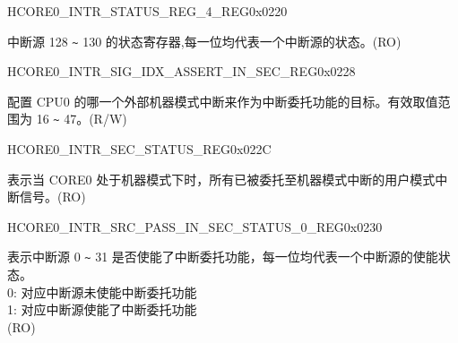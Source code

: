 \begin{register}{H}{CORE0\_INTR\_STATUS\_REG\_4\_REG}{0x0220}\label{regdesc:CORE0INTRSTATUSREG4REG}
%
\regnewline%
\begin{regdesc}\begin{reglist}
\label{fielddesc:CORE0INTRSTATUS4}\item [CORE0\_INTR\_STATUS\_4] 中断源 128 \verb+~+ 130 的状态寄存器,每一位均代表一个中断源的状态。(RO)
\end{reglist}\end{regdesc}
\end{register}

\begin{register}{H}{CORE0\_INTR\_SIG\_IDX\_ASSERT\_IN\_SEC\_REG}{0x0228}\label{regdesc:CORE0INTRSIGIDXASSERTINSECREG}
%
%
\regnewline%
\begin{regdesc}\begin{reglist}
\label{fielddesc:CORE0INTRSIGIDXASSERTINSEC}\item [CORE0\_INTR\_SIG\_IDX\_ASSERT\_IN\_SEC] 配置 CPU0 的哪一个外部机器模式中断来作为中断委托功能的目标。有效取值范围为 16 \verb+~+ 47。(R/W)
\end{reglist}\end{regdesc}
\end{register}

\begin{register}{H}{CORE0\_INTR\_SEC\_STATUS\_REG}{0x022C}\label{regdesc:CORE0INTRSECSTATUSREG}
%
\regnewline%
\begin{regdesc}\begin{reglist}
\label{fielddesc:CORE0INTRSECSTATUS3}\item [CORE0\_INTR\_SEC\_STATUS] 表示当 CORE0 处于机器模式下时，所有已被委托至机器模式中断的用户模式中断信号。(RO)

\end{reglist}\end{regdesc}
\end{register}

\begin{register}{H}{CORE0\_INTR\_SRC\_PASS\_IN\_SEC\_STATUS\_0\_REG}{0x0230}\label{regdesc:CORE0INTRSRCPASSINSECSTATUS0REG}
%
\regnewline%
\begin{regdesc}\begin{reglist}
\label{fielddesc:CORE0INTRSRCPASSINSECSTATUS0}\item [CORE0\_INTR\_SRC\_PASS\_IN\_SEC\_STATUS\_0] 表示中断源 0 \verb+~+ 31 是否使能了中断委托功能，每一位均代表一个中断源的使能状态。\\
0: 对应中断源未使能中断委托功能\\
1: 对应中断源使能了中断委托功能\\
(RO)
\end{reglist}\end{regdesc}
\end{register}

